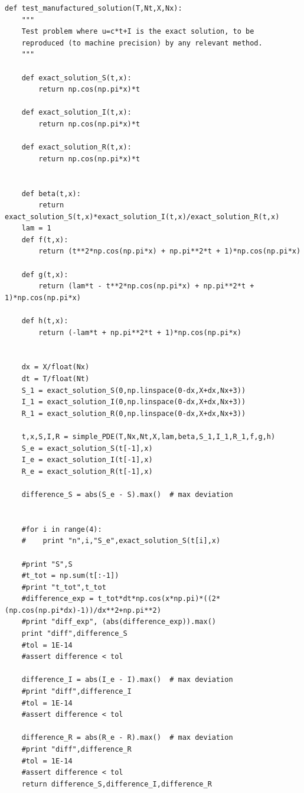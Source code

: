 \documentclass[%
twoside,                 %
final,                   %
10pt]{article}
\begin{document}
\begin{Verbatim}[numbers=none,fontsize=\fontsize{9pt}{9pt},baselinestretch=0.95]
def test_manufactured_solution(T,Nt,X,Nx):
    """
    Test problem where u=c*t+I is the exact solution, to be
    reproduced (to machine precision) by any relevant method.
    """
    
    def exact_solution_S(t,x):
        return np.cos(np.pi*x)*t

    def exact_solution_I(t,x):
        return np.cos(np.pi*x)*t

    def exact_solution_R(t,x):
        return np.cos(np.pi*x)*t


    def beta(t,x):
        return exact_solution_S(t,x)*exact_solution_I(t,x)/exact_solution_R(t,x)
    lam = 1
    def f(t,x):
        return (t**2*np.cos(np.pi*x) + np.pi**2*t + 1)*np.cos(np.pi*x) 

    def g(t,x):
        return (lam*t - t**2*np.cos(np.pi*x) + np.pi**2*t + 1)*np.cos(np.pi*x)

    def h(t,x):
        return (-lam*t + np.pi**2*t + 1)*np.cos(np.pi*x)
        

    dx = X/float(Nx)
    dt = T/float(Nt)
    S_1 = exact_solution_S(0,np.linspace(0-dx,X+dx,Nx+3))
    I_1 = exact_solution_I(0,np.linspace(0-dx,X+dx,Nx+3))
    R_1 = exact_solution_R(0,np.linspace(0-dx,X+dx,Nx+3))
     
    t,x,S,I,R = simple_PDE(T,Nx,Nt,X,lam,beta,S_1,I_1,R_1,f,g,h)
    S_e = exact_solution_S(t[-1],x)
    I_e = exact_solution_I(t[-1],x)
    R_e = exact_solution_R(t[-1],x)
    
    difference_S = abs(S_e - S).max()  # max deviation

    
    #for i in range(4):
    #    print "n",i,"S_e",exact_solution_S(t[i],x)
    
    #print "S",S
    #t_tot = np.sum(t[:-1])
    #print "t_tot",t_tot
    #difference_exp = t_tot*dt*np.cos(x*np.pi)*((2*(np.cos(np.pi*dx)-1))/dx**2+np.pi**2)
    #print "diff_exp", (abs(difference_exp)).max()
    print "diff",difference_S
    #tol = 1E-14
    #assert difference < tol
    
    difference_I = abs(I_e - I).max()  # max deviation
    #print "diff",difference_I
    #tol = 1E-14
    #assert difference < tol
   
    difference_R = abs(R_e - R).max()  # max deviation
    #print "diff",difference_R
    #tol = 1E-14
    #assert difference < tol
    return difference_S,difference_I,difference_R
\end{Verbatim}
\end{document}
